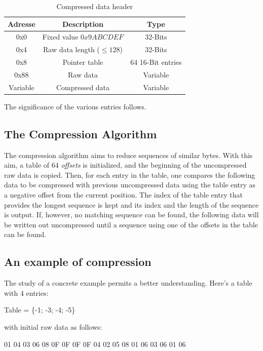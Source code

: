 \begin{table}[!ht]
\centering
\begin{tabular}{| c | c | c |}
\hline
\textbf{Adresse} & \textbf{Description} & \textbf{Type} \\
\hline
\hline
0x0 & Fixed value $0x9ABCDEF$ & 32-Bits \\
0x4 & Raw data length ($ \leq 128$) & 32-Bits \\
0x8 & Pointer table & 64 16-Bit entries \\
0x88 & Raw data & Variable \\
Variable & Compressed data & Variable \\
\hline
\end{tabular}
\caption{Compressed data header}
\label{tab:entete_compression}
\end{table}

The significance of the various entries follows.

\subsection{The Compression Algorithm}
The compression algorithm aims to reduce sequences of similar bytes.
With this aim, a table of $64$ \emph{offsets} is initialized, and the beginning of the uncompressed
raw data is copied.
Then, for each entry in the table, one compares the following data to be compressed with previous uncompressed data using the table entry as a negative offset from the current position.
The index of the table entry that provides the longest sequence is kept and its index
and the length of the sequence is output.
If, however, no matching sequence can be found, the following data will be written out
uncompressed until a sequence using one of the offsets in the table can be found.

\subsection{An example of compression}
The study of a concrete example permits a better understanding.
Here's a table with 4 entries:

\begin{exemple}
Table = \{-1; -3; -4; -5\}
\end{exemple}

with initial raw data as follows:
\begin{exemple}
01 04 03 06 08 0F 0F 0F 0F 04 02 05 08 01 06 03 06 01 06
\end{exemple}

